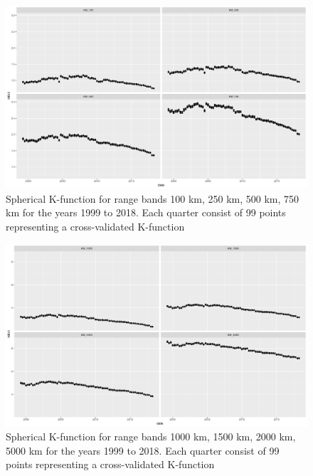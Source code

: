 \begin{figure}[h]
	\centering
	\includegraphics[width=1\textwidth]{Figures/ChapterIII/RIpley_K_100_750.pdf} 
	\caption[Spherical K-function for Range Bands 100km to 750km]{Spherical K-function for range bands 100 km, 250 km, 500 km, 750 km for the years 1999 to 2018. Each quarter consist of 99 points representing a cross-validated K-function}
	\label{fig:Kfunction100to750}
\end{figure}


\begin{figure}[h]
	\centering
	\includegraphics[width=1\textwidth]{Figures/ChapterIII/Cross_val_1000_5000.pdf} 
	\caption[Spherical K-function for Range Bands 1000km to 5000km]{Spherical K-function for range bands 1000 km, 1500 km, 2000 km, 5000 km for the years 1999 to 2018. Each quarter consist of 99 points representing a cross-validated K-function}
	\label{fig:Kfunction1000to5000}
\end{figure}





